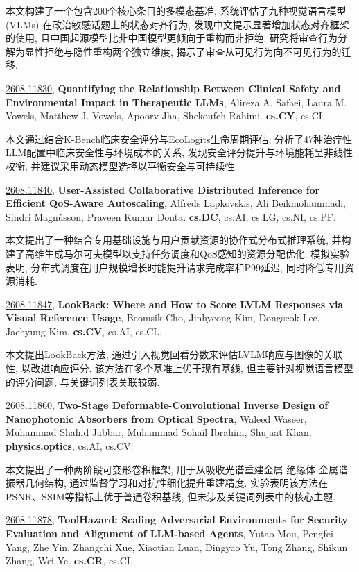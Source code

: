 \documentclass[9pt, a4paper]{article}
\theoremstyle{plain}
\theoremstyle{definition}
\theoremstyle{remark}
\newcommand{\arxivwithtarget}[3]{\hypertarget{#1}{}\href{https://arxiv.org/abs/#1}{#1}, \textbf{\textcolor{arxivblue}{#2}}, #3. }
\begin{document}
本文构建了一个包含200个核心条目的多模态基准, 系统评估了九种视觉语言模型(VLMs) 在政治敏感话题上的状态对齐行为, 发现中文提示显著增加状态对齐框架的使用, 且中国起源模型比非中国模型更倾向于重构而非拒绝. 研究将审查行为分解为显性拒绝与隐性重构两个独立维度, 揭示了审查从可见行为向不可见行为的迁移.


\arxivwithtarget{2608.11830}{Quantifying the Relationship Between Clinical Safety and Environmental Impact in Therapeutic LLMs}{Alireza A. Safaei, Laura M. Vowels, Matthew J. Vowels, Apoorv Jha, Shekoufeh Rahimi}\textbf{cs.CY}, cs.CL.

本文通过结合K-Bench临床安全评分与EcoLogits生命周期评估, 分析了47种治疗性LLM配置中临床安全性与环境成本的关系, 发现安全评分提升与环境能耗呈非线性权衡, 并建议采用动态模型选择以平衡安全与可持续性.


\arxivwithtarget{2608.11840}{User-Assisted Collaborative Distributed Inference for Efficient QoS-Aware Autoscaling}{Alfreds Lapkovskis, Ali Beikmohammadi, Sindri Magnússon, Praveen Kumar Donta}\textbf{cs.DC}, cs.AI, cs.LG, cs.NI, cs.PF.

本文提出了一种结合专用基础设施与用户贡献资源的协作式分布式推理系统, 并构建了高维生成马尔可夫模型以支持任务调度和QoS感知的资源分配优化. 模拟实验表明, 分布式调度在用户规模增长时能提升请求完成率和P99延迟, 同时降低专用资源消耗.


\arxivwithtarget{2608.11847}{LookBack: Where and How to Score LVLM Responses via Visual Reference Usage}{Beomsik Cho, Jinhyeong Kim, Dongseok Lee, Jaehyung Kim}\textbf{cs.CV}, cs.AI, cs.CL.

本文提出LookBack方法, 通过引入视觉回看分数来评估LVLM响应与图像的关联性, 以改进响应评分. 该方法在多个基准上优于现有基线, 但主要针对视觉语言模型的评分问题, 与关键词列表关联较弱.


\arxivwithtarget{2608.11860}{Two-Stage Deformable-Convolutional Inverse Design of Nanophotonic Absorbers from Optical Spectra}{Waleed Waseer, Muhammad Shahid Jabbar, Muhammad Sohail Ibrahim, Shujaat Khan}\textbf{physics.optics}, cs.AI, cs.CV.

本文提出了一种两阶段可变形卷积框架, 用于从吸收光谱重建金属-绝缘体-金属谐振器几何结构, 通过监督学习和对抗性细化提升重建精度. 实验表明该方法在PSNR、SSIM等指标上优于普通卷积基线, 但未涉及关键词列表中的核心主题.


\arxivwithtarget{2608.11878}{ToolHazard: Scaling Adversarial Environments for Security Evaluation and Alignment of LLM-based Agents}{Yutao Mou, Pengfei Yang, Zhe Yin, Zhangchi Xue, Xiaotian Luan, Dingyao Yu, Tong Zhang, Shikun Zhang, Wei Ye}\textbf{cs.CR}, cs.CL.
\end{document}
